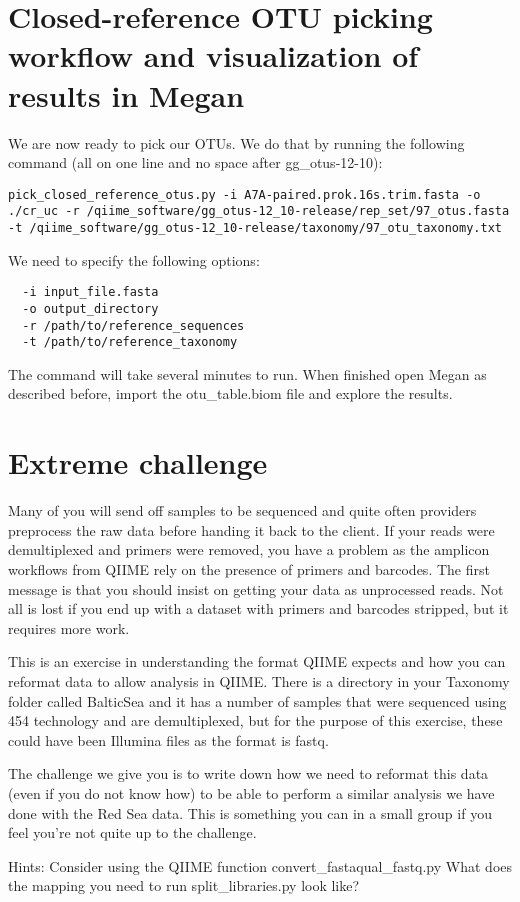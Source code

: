 \documentclass[a4paper,12pt,twoside]{memoir}
\begin{document}
\section{Closed-reference OTU picking workflow and visualization of results in Megan}

\begin{steps}
We are now ready to pick our OTUs. We do that by running the following command (all on one line and no space after gg\_otus-12-10): 

\begin{lstlisting}
pick_closed_reference_otus.py -i A7A-paired.prok.16s.trim.fasta -o ./cr_uc -r /qiime_software/gg_otus-12_10-release/rep_set/97_otus.fasta -t /qiime_software/gg_otus-12_10-release/taxonomy/97_otu_taxonomy.txt
\end{lstlisting}
\end{steps}

\begin{note}
We need to specify the following options:
\begin{lstlisting}
  -i input_file.fasta
  -o output_directory
  -r /path/to/reference_sequences
  -t /path/to/reference_taxonomy
\end{lstlisting}

The command will take several minutes to run. When finished open Megan as described before, import the otu\_table.biom file and explore the results.
\end{note}

\section{Extreme challenge}

\begin{information}
Many of you will send off samples to be sequenced and quite often providers preprocess the raw data before handing it back to the client. If your reads were demultiplexed and primers were removed, you have a problem as the amplicon workflows from QIIME rely on the presence of primers and barcodes. The first message is that you should insist on getting your data as unprocessed reads. Not all is lost if you end up with a dataset with primers and barcodes stripped, but it requires more work.

This is an exercise in understanding the format QIIME expects and how you can reformat data to allow analysis in QIIME.
There is a directory in your Taxonomy folder called BalticSea and it has a number of samples that were sequenced using 454 technology and are demultiplexed, but for the purpose of this exercise, these could have been Illumina files as the format is fastq. 

The challenge we give you is to write down how we need to reformat this data (even if you do not know how) to be able to perform a similar analysis we have done with the Red Sea data. This is something you can in a small group if you feel you're not quite up to the challenge. 

Hints:
Consider using the QIIME function convert\_fastaqual\_fastq.py
What does the mapping you need to run split\_libraries.py look like?
\end{information}
\end{document}
